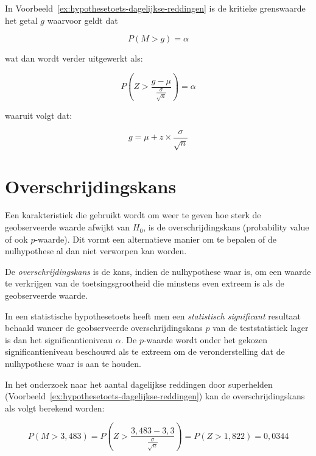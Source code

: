 In Voorbeeld~\ref{ex:hypothesetoets-dagelijkse-reddingen} is de kritieke grenswaarde het getal $g$ waarvoor geldt dat

\[ P(M > g) = \alpha \]

wat dan wordt verder uitgewerkt als:

\[ P(Z > \frac{g - \mu}{\frac{\sigma}{\sqrt{n}}}) = \alpha \]

waaruit volgt dat:

\begin{equation}
  \label{eq:kritieke-waarde-rechtszijdig}
  g = \mu + z \times \frac{\sigma}{\sqrt{n}}
\end{equation}

\section{Overschrijdingskans}
\label{sec:overschrijdingskans}

Een karakteristiek die gebruikt wordt om weer te geven hoe sterk de geobserveerde waarde afwijkt van $H_{0}$, is de overschrijdingskans (probability value of ook $p$-waarde). Dit vormt een alternatieve manier om te bepalen of de nulhypothese al dan niet verworpen kan worden.

\begin{definition}[overschrijdingskans]
  De \emph{overschrijdingskans} is de kans, indien de nulhypothese waar is, om een waarde te verkrijgen van de toetsingsgrootheid die minstens even extreem is als de geobserveerde waarde.
\end{definition}

\begin{definition}
  In een statistische hypothesetoets heeft men een \emph{statistisch significant} resultaat behaald waneer de geobserveerde overschrijdingskans $p$ van de teststatistiek lager is dan het significantieniveau $\alpha$. De $p$-waarde wordt onder het gekozen significantieniveau beschouwd als te extreem om de veronderstelling dat de nulhypothese waar is aan te houden.
\end{definition}

\begin{example}
  In het onderzoek naar het aantal dagelijkse reddingen door superhelden (Voorbeeld~\ref{ex:hypothesetoets-dagelijkse-reddingen}) kan de overschrijdingskans als volgt berekend worden:
  
\[ P(M > 3,483) = P \left(Z> \frac{3,483 - 3,3}{\frac{\sigma}{\sqrt{n}}}\right) = P (Z > 1,822) = 0,0344 \]
\end{example}

